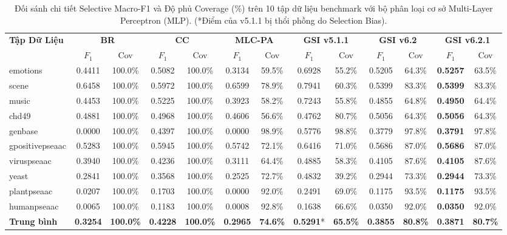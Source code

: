 \documentclass[10pt,a4paper,twoside]{article}
\begin{document}
\begin{table}[H]
\centering
\footnotesize
\setlength{\tabcolsep}{2.2pt}
\caption{Đối sánh chi tiết Selective Macro-F1 và Độ phủ Coverage (\%) trên 10 tập dữ liệu benchmark với bộ phân loại cơ sở Multi-Layer Perceptron (MLP). (*Điểm của v5.1.1 bị thổi phồng do Selection Bias).}
\label{tab:mlp_detail}
\vspace{0.4em}
\begin{tabular*}{\textwidth}{@{\extracolsep{\fill}}lcccccccccccc@{}}
\toprule
\multirow{2}{*}{\textbf{Tập Dữ Liệu}} & \multicolumn{2}{c}{\textbf{BR}} & \multicolumn{2}{c}{\textbf{CC}} & \multicolumn{2}{c}{\textbf{MLC-PA}} & \multicolumn{2}{c}{\textbf{GSI v5.1.1}} & \multicolumn{2}{c}{\textbf{GSI v6.2}} & \multicolumn{2}{c}{\textbf{GSI v6.2.1}} \\
\cmidrule(lr){2-3} \cmidrule(lr){4-5} \cmidrule(lr){6-7} \cmidrule(lr){8-9} \cmidrule(lr){10-11} \cmidrule(lr){12-13}
& $F_1$ & Cov & $F_1$ & Cov & $F_1$ & Cov & $F_1$ & Cov & $F_1$ & Cov & $F_1$ & Cov \\
\midrule
emotions & 0.4411 & 100.0\% & 0.5082 & 100.0\% & 0.3134 & 59.5\% & 0.6928 & 55.2\% & 0.5205 & 64.3\% & \textbf{0.5257} & 63.5\% \\
scene & 0.6458 & 100.0\% & 0.5972 & 100.0\% & 0.6599 & 78.9\% & 0.7941 & 60.3\% & 0.5399 & 83.3\% & \textbf{0.5399} & 83.3\% \\
music & 0.4453 & 100.0\% & 0.5225 & 100.0\% & 0.3923 & 58.2\% & 0.7243 & 55.8\% & 0.4855 & 64.8\% & \textbf{0.4950} & 64.4\% \\
chd49 & 0.4881 & 100.0\% & 0.4968 & 100.0\% & 0.4606 & 56.6\% & 0.4762 & 80.7\% & 0.5056 & 64.3\% & \textbf{0.5056} & 64.3\% \\
genbase & 0.0000 & 100.0\% & 0.4397 & 100.0\% & 0.0000 & 98.9\% & 0.5776 & 98.8\% & 0.3779 & 97.8\% & \textbf{0.3791} & 97.8\% \\
gpositivepseaac & 0.5283 & 100.0\% & 0.5945 & 100.0\% & 0.5742 & 72.1\% & 0.6416 & 71.0\% & 0.5686 & 87.0\% & \textbf{0.5686} & 87.0\% \\
viruspseaac & 0.3940 & 100.0\% & 0.4236 & 100.0\% & 0.3111 & 64.4\% & 0.4885 & 58.3\% & 0.4105 & 87.6\% & \textbf{0.4105} & 87.6\% \\
yeast & 0.2841 & 100.0\% & 0.3568 & 100.0\% & 0.2525 & 72.7\% & 0.4832 & 39.2\% & 0.2944 & 73.3\% & \textbf{0.2944} & 73.3\% \\
plantpseaac & 0.0207 & 100.0\% & 0.1703 & 100.0\% & 0.0000 & 92.0\% & 0.2491 & 69.0\% & 0.1175 & 93.5\% & \textbf{0.1175} & 93.5\% \\
humanpseaac & 0.0065 & 100.0\% & 0.1183 & 100.0\% & 0.0008 & 92.8\% & 0.1638 & 66.6\% & 0.0350 & 92.0\% & \textbf{0.0350} & 92.0\% \\
\midrule
\textbf{Trung bình} & \textbf{0.3254} & \textbf{100.0\%} & \textbf{0.4228} & \textbf{100.0\%} & \textbf{0.2965} & \textbf{74.6\%} & \textbf{0.5291}* & \textbf{65.5\%} & \textbf{0.3855} & \textbf{80.8\%} & \textbf{0.3871} & \textbf{80.7\%} \\
\bottomrule
\end{tabular*}
\end{table}
\end{document}
